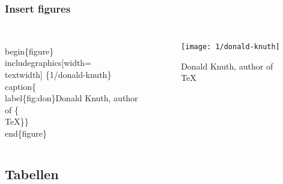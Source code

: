 \documentclass[aspectratio=169]{beamer}
\begin{document}
\begin{frame}
 \frametitle{Insert figures}

 \begin{columns}[c]

\begin{semiverbatim}
\alert<1>{\\begin\{figure\}}
\alert<2>{\\includegraphics[width=\\textwidth]
 \{1/donald-knuth\}}
\alert<3>{\\caption\{\alert<4>{\\label\{fig:don\}}Donald Knuth, author of
 \{\\TeX\}\}}
\alert<1>{\\end\{figure\}}
\end{semiverbatim}

   \begin{figure}
     \texttt{[image: 1/donald-knuth]}
     \caption{\label{fig:don}Donald Knuth, author of {\TeX}}
   \end{figure}

 \end{columns}

\end{frame}

\subsection{Tabellen}
\end{document}
